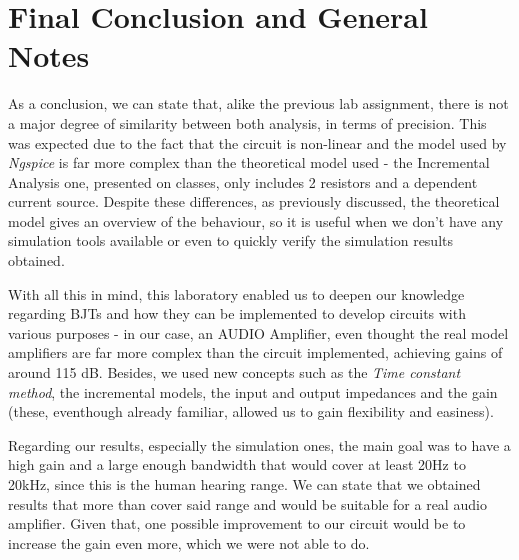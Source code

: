 \section{Final Conclusion and General Notes}
\label{sec:conclusion}

As a conclusion, we can state that, alike the previous lab assignment, there is not a major degree of similarity between both analysis, in terms of precision. This was expected due to the fact that the circuit is non-linear and the model used by \textit{Ngspice} is far more complex than the theoretical model used - the Incremental Analysis one, presented on classes, only includes 2 resistors and a dependent current source. Despite these differences, as previously discussed, the theoretical model gives an overview of the behaviour, so it is useful when we don't have any simulation tools available or even to quickly verify the simulation results obtained.

With all this in mind, this laboratory enabled us to deepen our knowledge regarding BJTs and how they can be implemented to develop circuits with various purposes - in our case, an AUDIO Amplifier, even thought the real model amplifiers are far more complex than the circuit implemented, achieving gains of around 115 dB. Besides, we used new concepts such as the \textit{Time constant method}, the incremental models, the input and output impedances and the gain (these, eventhough already familiar, allowed us to gain flexibility and easiness).

Regarding our results, especially the simulation ones, the main goal was to have a high gain and a large enough bandwidth that would cover at least 20Hz to 20kHz, since this is the human hearing range. We can state that we obtained results that more than cover said range and would be suitable for a real audio amplifier. Given that, one possible improvement to our circuit would be to increase the gain even more, which we were not able to do.
